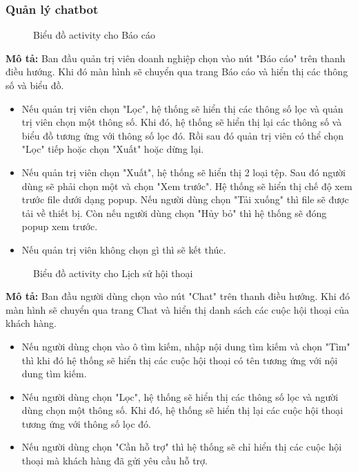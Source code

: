 \subsubsection{Quản lý chatbot}
\begin{figure}[H]
    \centering
     
    \vspace{0.5cm}
    \caption{Biểu đồ activity cho Báo cáo}
    \label{fig:enter-label}
\end{figure}
\textbf{Mô tả:}
Ban đầu quản trị viên doanh nghiệp chọn vào nút "Báo cáo" trên thanh điều hướng. Khi đó màn hình sẽ chuyển qua trang Báo cáo và hiển thị các thông số và biểu đồ.
\begin{itemize}
    \item Nếu quản trị viên chọn "Lọc", hệ thống sẽ hiển thị các thông số lọc và quản trị viên chọn một thông số. Khi đó, hệ thống sẽ hiển thị lại các thông số và biểu đồ tương ứng với thông số lọc đó. Rồi sau đó quản trị viên có thể chọn "Lọc" tiếp hoặc chọn "Xuất" hoặc dừng lại.
    \item Nếu quản trị viên chọn "Xuất", hệ thống sẽ hiển thị 2 loại tệp. Sau đó người dùng sẽ phải chọn một và chọn "Xem trước". Hệ thống sẽ hiển thị chế độ xem trước file dưới dạng popup. Nếu người dùng chọn "Tải xuống" thì file sẽ được tải về thiết bị. Còn nếu người dùng chọn "Hủy bỏ" thì hệ thống sẽ đóng popup xem trước.
    \item Nếu quản trị viên không chọn gì thì sẽ kết thúc.
\end{itemize}
\begin{figure}[H]
    \centering
     
    \vspace{0.5cm}
    \caption{Biểu đồ activity cho Lịch sử hội thoại}
    \label{fig:enter-label}
\end{figure}
\textbf{Mô tả:}
Ban đầu người dùng chọn vào nút "Chat" trên thanh điều hướng. Khi đó màn hình sẽ chuyển qua trang Chat và hiển thị danh sách các cuộc hội thoại của khách hàng.
\begin{itemize}
    \item Nếu người dùng chọn vào ô tìm kiếm, nhập nội dung tìm kiếm và chọn "Tìm" thì khi đó hệ thống sẽ hiển thị các cuộc hội thoại có tên tương ứng với nội dung tìm kiếm.
    \item Nếu người dùng chọn "Lọc", hệ thống sẽ hiển thị các thông số lọc và người dùng chọn một thông số. Khi đó, hệ thống sẽ hiển thị lại các cuộc hội thoại tương ứng với thông số lọc đó. 
    \item Nếu người dùng chọn "Cần hỗ trợ" thì hệ thống sẽ chỉ hiển thị các cuộc hội thoại mà khách hàng đã gửi yêu cầu hỗ trợ.
\end{itemize}

